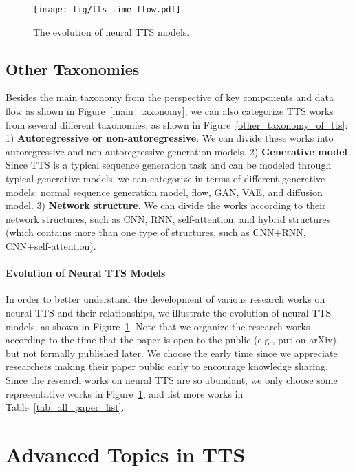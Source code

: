 \documentclass{article}
\begin{document}
\begin{figure}[h]
  \centering
  \texttt{[image: fig/tts\_time\_flow.pdf]}
  \caption{The evolution of neural TTS models.}
  \label{fig_tts_timeline}
\end{figure}



\subsection{Other Taxonomies}
\label{sec_funda_other}
Besides the main taxonomy from the perspective of key components and data flow as shown in Figure~\ref{main_taxonomy}, we can also categorize TTS works from several different taxonomies, as shown in Figure~\ref{other_taxonomy_of_tts}: 1) \textbf{Autoregressive or non-autoregressive}. We can divide these works into autoregressive and non-autoregressive generation models. 2) \textbf{Generative model}. Since TTS is a typical sequence generation task and can be modeled through typical generative models, we can categorize in terms of different generative models: normal sequence generation model, flow, GAN, VAE, and diffusion model. 3) \textbf{Network structure}. We can divide the works according to their network structures, such as CNN, RNN, self-attention, and hybrid structures (which contains more than one type of structures, such as CNN+RNN, CNN+self-attention). 

\paragraph{Evolution of Neural TTS Models} In order to better understand the development of various research works on neural TTS and their relationships, we illustrate the evolution of neural TTS models, as shown in Figure~\ref{fig_tts_timeline}. Note that we organize the research works according to the time that the paper is open to the public (e.g., put on arXiv), but not formally published later. We choose the early time since we appreciate researchers making their paper public early to encourage knowledge sharing. Since the research works on neural TTS are so abundant, we only choose some representative works in Figure~\ref{fig_tts_timeline}, and list more works in Table~\ref{tab_all_paper_list}.





\section{Advanced Topics in TTS}
\label{sec_advanced}
\end{document}
